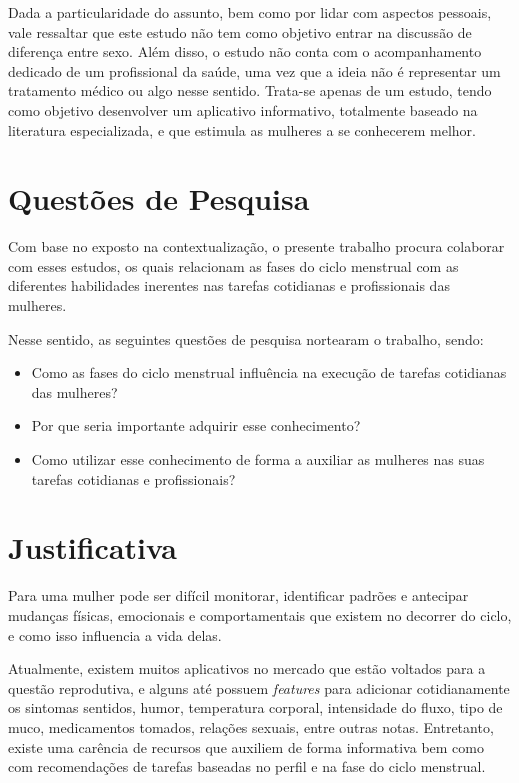 Dada a particularidade do assunto, bem como por lidar com aspectos pessoais, vale ressaltar que este 
estudo não tem como objetivo entrar na discussão de diferença entre sexo. Além disso, o estudo não 
conta com o acompanhamento dedicado de um profissional da saúde, uma vez que a ideia não é representar 
um tratamento médico ou algo nesse sentido. Trata-se apenas de um estudo, tendo como objetivo desenvolver 
um aplicativo informativo, totalmente baseado na literatura especializada, e que estimula as mulheres a 
se conhecerem melhor. 


\section{Questões de Pesquisa}

Com base no exposto na contextualização, o presente trabalho procura colaborar com esses estudos, 
os quais relacionam as fases do ciclo menstrual com as diferentes habilidades inerentes nas tarefas 
cotidianas e profissionais das mulheres.

Nesse sentido, as seguintes questões de pesquisa nortearam o trabalho, sendo:

\begin{itemize}

        \item Como as fases do ciclo menstrual influência na execução de tarefas cotidianas das mulheres?

        \item Por que seria importante adquirir esse conhecimento? 

        \item Como utilizar esse conhecimento de forma a auxiliar as mulheres nas suas tarefas cotidianas e profissionais?

\end{itemize}

\section{Justificativa}

Para uma mulher pode ser difícil monitorar, identificar padrões e antecipar mudanças físicas, 
emocionais e comportamentais que existem no decorrer do ciclo, e como isso influencia a vida delas.

Atualmente, existem muitos aplicativos no mercado que estão voltados para a questão reprodutiva, 
e alguns até possuem \textit{features} para adicionar cotidianamente os sintomas sentidos, humor, 
temperatura corporal, intensidade do fluxo, tipo de muco, medicamentos tomados, relações sexuais, 
entre outras notas. Entretanto, existe uma carência de recursos que auxiliem de forma informativa bem 
como com recomendações de tarefas baseadas no perfil e na fase do ciclo menstrual.

